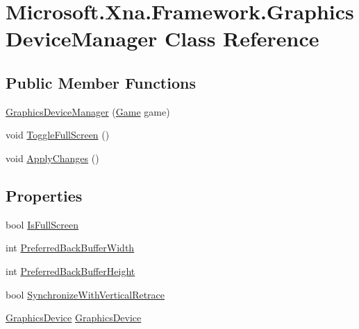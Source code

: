 \hypertarget{class_microsoft_1_1_xna_1_1_framework_1_1_graphics_device_manager}{}\section{Microsoft.\+Xna.\+Framework.\+Graphics\+Device\+Manager Class Reference}
\label{class_microsoft_1_1_xna_1_1_framework_1_1_graphics_device_manager}
\subsection*{Public Member Functions}
\begin{DoxyCompactItemize}
\item 
\hyperlink{class_microsoft_1_1_xna_1_1_framework_1_1_graphics_device_manager_a7fb4e2351ae35db086c75156333df14a}{Graphics\+Device\+Manager} (\hyperlink{class_microsoft_1_1_xna_1_1_framework_1_1_game}{Game} game)
\item 
void \hyperlink{class_microsoft_1_1_xna_1_1_framework_1_1_graphics_device_manager_abab3b3f55ab5dc42e129b2156abd3d87}{Toggle\+Full\+Screen} ()
\item 
void \hyperlink{class_microsoft_1_1_xna_1_1_framework_1_1_graphics_device_manager_acfb775b283c8306d595607ef97192a93}{Apply\+Changes} ()
\end{DoxyCompactItemize}
\subsection*{Properties}
\begin{DoxyCompactItemize}
\item 
bool \hyperlink{class_microsoft_1_1_xna_1_1_framework_1_1_graphics_device_manager_ac818a9e4d348553da143b7240a90bf00}{Is\+Full\+Screen}
\item 
int \hyperlink{class_microsoft_1_1_xna_1_1_framework_1_1_graphics_device_manager_aff78f559d62689891ac7d2c99940251f}{Preferred\+Back\+Buffer\+Width}
\item 
int \hyperlink{class_microsoft_1_1_xna_1_1_framework_1_1_graphics_device_manager_a795847be17069bd4b5313c454031ae7a}{Preferred\+Back\+Buffer\+Height}
\item 
bool \hyperlink{class_microsoft_1_1_xna_1_1_framework_1_1_graphics_device_manager_a43fad34e9f0bd9d30ade61bcb31136c1}{Synchronize\+With\+Vertical\+Retrace}
\item 
\hyperlink{class_microsoft_1_1_xna_1_1_framework_1_1_graphics_1_1_graphics_device}{Graphics\+Device} \hyperlink{class_microsoft_1_1_xna_1_1_framework_1_1_graphics_device_manager_a7a10600b40536216ce1538b855e97cfd}{Graphics\+Device}
\end{DoxyCompactItemize}


